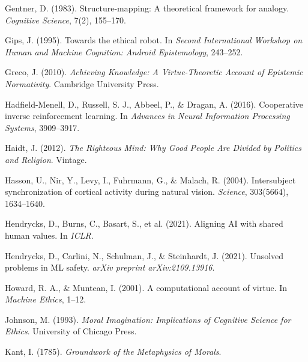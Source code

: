 \documentclass[12pt]{article}
\begin{document}
\begin{thebibliography}{99}
Gentner, D. (1983).
\newblock Structure-mapping: A theoretical framework for analogy.
\newblock \textit{Cognitive Science}, 7(2), 155--170.

Gips, J. (1995).
\newblock Towards the ethical robot.
\newblock In \textit{Second International Workshop on Human and Machine Cognition: Android Epistemology}, 243--252.

Greco, J. (2010).
\newblock \textit{Achieving Knowledge: A Virtue-Theoretic Account of Epistemic Normativity}.
\newblock Cambridge University Press.

Hadfield-Menell, D., Russell, S. J., Abbeel, P., \& Dragan, A. (2016).
\newblock Cooperative inverse reinforcement learning.
\newblock In \textit{Advances in Neural Information Processing Systems}, 3909--3917.

Haidt, J. (2012).
\newblock \textit{The Righteous Mind: Why Good People Are Divided by Politics and Religion}.
\newblock Vintage.

Hasson, U., Nir, Y., Levy, I., Fuhrmann, G., \& Malach, R. (2004).
\newblock Intersubject synchronization of cortical activity during natural vision.
\newblock \textit{Science}, 303(5664), 1634--1640.

Hendrycks, D., Burns, C., Basart, S., et al. (2021).
\newblock Aligning AI with shared human values.
\newblock In \textit{ICLR}.

Hendrycks, D., Carlini, N., Schulman, J., \& Steinhardt, J. (2021).
\newblock Unsolved problems in ML safety.
\newblock \textit{arXiv preprint arXiv:2109.13916}.

Howard, R. A., \& Muntean, I. (2001).
\newblock A computational account of virtue.
\newblock In \textit{Machine Ethics}, 1--12.

Johnson, M. (1993).
\newblock \textit{Moral Imagination: Implications of Cognitive Science for Ethics}.
\newblock University of Chicago Press.

Kant, I. (1785).
\newblock \textit{Groundwork of the Metaphysics of Morals}.


\end{thebibliography}
\end{document}
